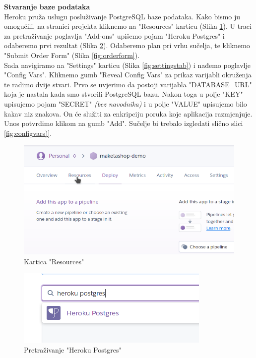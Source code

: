 			\noindent\textbf{Stvaranje baze podataka}\\
			Heroku pruža uslugu posluživanje PostgreSQL baze podataka. Kako bismo ju omogućili, na stranici projekta kliknemo na "Resources" karticu (Slika \ref{fig:resourcestab}). U traci za pretraživanje poglavlja "Add-ons" upišemo pojam "Heroku Postgres" i odaberemo prvi rezultat (Slika \ref{fig:herokupostgres}). Odaberemo plan pri vrhu sučelja, te kliknemo "Submit Order Form" (Slika \ref{fig:orderform}).\\
			Sada navigiramo na "Settings"  karticu (Slika \ref{fig:settingstab}) i nađemo poglavlje "Config Vars". Kliknemo gumb "Reveal Config Vars" za prikaz varijabli okruženja te radimo dvije stvari. Prvo se uvjerimo da postoji varijabla "DATABASE\_URL" koja je nastala kada smo stvorili PostgreSQL bazu. Nakon toga u polje "KEY" upisujemo pojam "SECRET" \textit{(bez navodnika)} i u polje "VALUE" upisujemo bilo kakav niz znakova. On će služiti za enkripciju poruka koje aplikacija razmjenjuje. Unos potvrdimo klikom na gumb "Add". Sučelje bi trebalo izgledati slično slici \ref{fig:configvars)}.
			\begin{figure}[H]
				\includegraphics[width=.9\linewidth]{slike/20210114_214638.png}
				\centering
				\caption{Kartica "Resources"}
				\label{fig:resourcestab}
			\end{figure}
			\begin{figure}[H]
				\includegraphics[width=.9\linewidth]{slike/20210114_215207.png}
				\centering
				\caption{Pretraživanje "Heroku Postgres"}
				\label{fig:herokupostgres}
			\end{figure}
